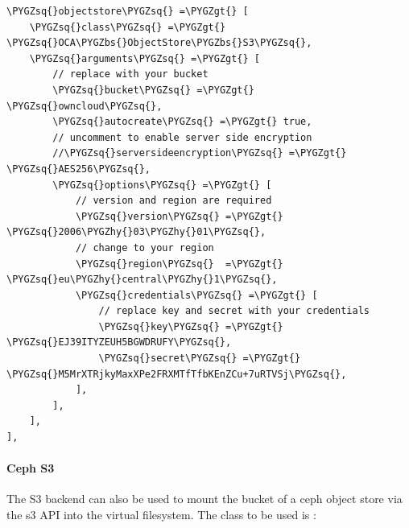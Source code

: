 \documentclass[letterpaper,10pt,english]{sphinxmanual}
\def\PYGZbs{\char`\\}
\def\PYGZgt{\char`\>}
\def\PYGZhy{\char`\-}
\def\PYGZsq{\char`\'}
\begin{document}
\begin{Verbatim}[commandchars=\\\{\}]
\PYGZsq{}objectstore\PYGZsq{} =\PYGZgt{} [
    \PYGZsq{}class\PYGZsq{} =\PYGZgt{} \PYGZsq{}OCA\PYGZbs{}ObjectStore\PYGZbs{}S3\PYGZsq{},
    \PYGZsq{}arguments\PYGZsq{} =\PYGZgt{} [
        // replace with your bucket
        \PYGZsq{}bucket\PYGZsq{} =\PYGZgt{} \PYGZsq{}owncloud\PYGZsq{},
        \PYGZsq{}autocreate\PYGZsq{} =\PYGZgt{} true,
        // uncomment to enable server side encryption
        //\PYGZsq{}serversideencryption\PYGZsq{} =\PYGZgt{} \PYGZsq{}AES256\PYGZsq{},
        \PYGZsq{}options\PYGZsq{} =\PYGZgt{} [
            // version and region are required
            \PYGZsq{}version\PYGZsq{} =\PYGZgt{} \PYGZsq{}2006\PYGZhy{}03\PYGZhy{}01\PYGZsq{},
            // change to your region
            \PYGZsq{}region\PYGZsq{}  =\PYGZgt{} \PYGZsq{}eu\PYGZhy{}central\PYGZhy{}1\PYGZsq{},
            \PYGZsq{}credentials\PYGZsq{} =\PYGZgt{} [
                // replace key and secret with your credentials
                \PYGZsq{}key\PYGZsq{} =\PYGZgt{} \PYGZsq{}EJ39ITYZEUH5BGWDRUFY\PYGZsq{},
                \PYGZsq{}secret\PYGZsq{} =\PYGZgt{} \PYGZsq{}M5MrXTRjkyMaxXPe2FRXMTfTfbKEnZCu+7uRTVSj\PYGZsq{},
            ],
        ],
    ],
],
\end{Verbatim}


\paragraph{Ceph S3}
\label{enterprise_external_storage/s3_swift_as_primary_object_store_configuration:ceph-s3}
The S3 backend can also be used to mount the bucket of a ceph object store via the s3 API
into the virtual filesystem. The class to be used is :
\end{document}
